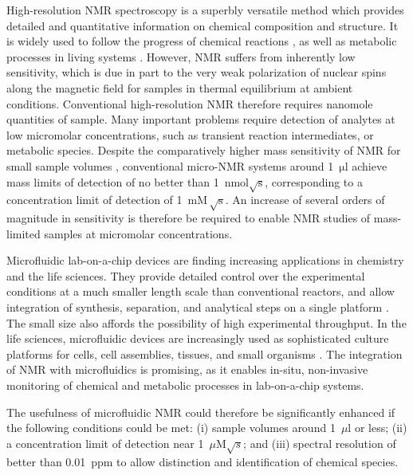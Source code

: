 High-resolution NMR
spectroscopy is a superbly versatile method which provides detailed and
quantitative information on chemical composition and structure. It is widely
used to follow the progress of chemical reactions
\cite{Foley-quantitative:2004bk,Foley:2014kpa},
as well as
metabolic processes in living systems
\cite{Wishart:2008ga,Gottschalk:2008ixa,CuperlovicCulf:2010vc,Shintu:2012bl}.
However, NMR suffers from inherently low sensitivity,
which is due in part to the very weak polarization of nuclear spins along the magnetic
field for samples in thermal equilibrium at ambient conditions.
Conventional high-resolution NMR therefore requires nanomole quantities of
sample. Many important problems require detection of analytes at low
micromolar concentrations, such as transient reaction intermediates, or
metabolic species. Despite the
comparatively higher mass sensitivity of NMR for small sample volumes
\cite{Olson:1995vu,Bart:2009kc}, conventional micro-NMR systems  around
1~$\mathrm{\mu l}$ achieve mass limits of detection of no better than\cite{Finch:2016gv}
1~nmol$\sqrt{\mathrm{s}}$,  corresponding to a concentration
limit of detection of 1~$\mathrm{m M \, \sqrt{s}}$. An increase of several
orders of magnitude in sensitivity is therefore be required to enable NMR
studies of mass-limited samples at micromolar concentrations.

Microfluidic lab-on-a-chip devices are finding increasing applications in
chemistry and the
life sciences. They provide detailed control over the experimental
conditions at a much smaller length scale than conventional reactors, and
allow integration of synthesis, separation, and analytical steps on
a single platform \cite{Wang:2006en,Theberge:2012iq,Hoang:2011du,Ohno:2008da,Zhou:2004id,
Fang:2018ib,Hoang:2011ee,Gunther:2006vd}. The small size also affords the possibility of
high experimental throughput.
In the life sciences, microfluidic devices are increasingly used as
sophisticated culture platforms for cells,
cell assemblies, tissues, and small organisms
\cite{Manz:1990vc,Whitesides:2006vi,
ElAli:2006ci,West:2008jd,Neuzil:2012gc,Gracz:2015co}.
The integration of NMR with microfluidics
\cite{Ryan:2012ke,Badilita:2011td,Spengler:2014ir,Finch:2016gv} is promising, as
it enables in-situ, non-invasive monitoring of chemical and metabolic processes
in lab-on-a-chip systems.

The usefulness of microfluidic NMR could therefore be significantly
enhanced if the following conditions could be met:
(i) sample volumes around 1~$\mu$l or less;
(ii) a concentration limit of
detection near  1~$\mu$M$\sqrt{s}$; and
(iii)  spectral
resolution of better than 0.01~ppm to allow distinction and identification
of chemical species.

